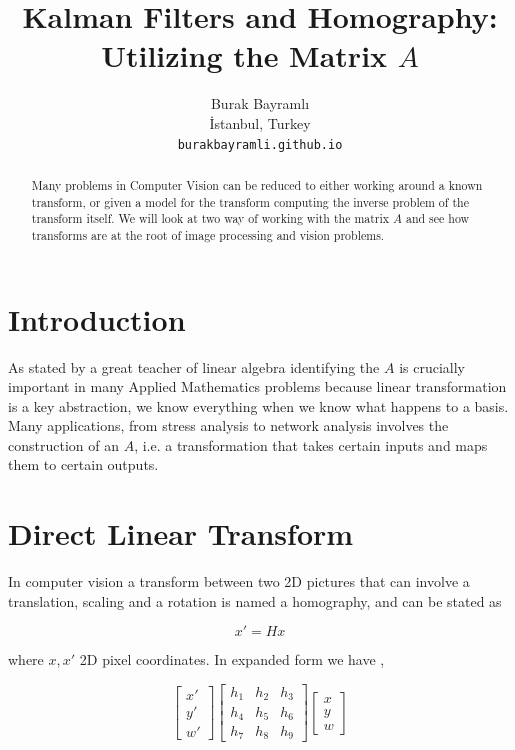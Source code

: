 \documentclass{article}
\title{Kalman Filters and Homography: Utilizing the Matrix $A$}
\author{
  Burak Bayramlı \\
  İstanbul, Turkey\\
  \texttt{burakbayramli.github.io} 
}
\begin{document}
\maketitle

\begin{abstract}
Many problems in Computer Vision can be reduced to either working around a known
transform, or given a model for the transform computing the inverse problem of
the transform itself. We will look at two way of working with the matrix $A$ and
see how transforms are at the root of image processing and vision problems.
\end{abstract}



\section{Introduction}

As stated by a great teacher of linear algebra identifying the $A$ is crucially
important in many Applied Mathematics problems \cite{strang} because linear
transformation is a key abstraction, we know everything when we know what
happens to a basis. Many applications, from stress analysis to network analysis
involves the construction of an $A$, i.e. a transformation that takes certain
inputs and maps them to certain outputs.

\section{Direct Linear Transform}

In computer vision a transform between two 2D pictures that can involve a
translation, scaling and a rotation is named a homography, and can be stated as

$$ x' = H x$$

where $x,x'$ 2D pixel coordinates. In expanded form we have \cite{solem},

$$ 
\left[\begin{array}{r} x' \\ y' \\ w' \end{array}\right]
\left[\begin{array}{rrr}
h_1 & h_2 & h_3 \\
h_4 & h_5 & h_6 \\
h_7 & h_8 & h_9 
\end{array}\right]
\left[\begin{array}{r} x \\ y \\ w \end{array}\right]
$$
\end{document}
